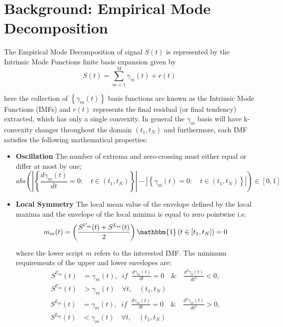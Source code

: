 \section{Background: Empirical Mode Decomposition}\label{sec:EMD_background}


\begin{Definition}
The Empirical Mode Decomposition of signal $S(t)$ is represented by the Intrinsic Mode Functions finite basis expansion given by
\begin{equation}
\label{EMD-for}
S(t) = \sum_{m=1}^M \gamma_m \left(t\right) + r \left(t \right)
\end{equation}

here the collection of $\left\{\gamma_m(t)\right\}$ basis functions are known as the Intrinsic Mode Functions (IMFs) and $r \left(t \right)$ represents the final residual (or final tendency) extracted, which has only a single convexity. In general the $\gamma_m$ basis will have k-convexity changes throughout the domain $(t_1, t_N)$ and furthermore, each IMF satisfies the following mathematical properties:
\begin{itemize}
\item \textbf{Oscillation} The number of extrema and zero-crossing must either equal or differ at most by one;
\begin{equation}
abs \left( \left| \left\{ \frac{d \gamma_m (t)}{dt} = 0 : \quad t \in \left( t_1, t_N \right) \right\} \right| - \left| \left\{ \gamma_m (t) = 0 : \quad t \in \left( t_1, t_N \right) \right\} \right| \right)  \in  \left[ 0, 1 \right]
\end{equation}
\item \textbf{Local Symmetry} The local mean value of the envelope defined by the local maxima and the envelope of the local minima is equal to zero pointwise i.e.   
\begin{equation}
\label{mean_env}
m_m(t) = \left(\frac{S^{U_m} (t) + S^{L_m} (t)}{2} \right) \mathbbm{1} \left( t \in [t_1, t_N] \right) = 0
\end{equation}

where the lower script $m$ refers to the interested IMF. The minimum requirements of the upper and lower envelopes are: 
\begin{equation}
\label{cond_1_sp}
\begin{split}
S^{U_m}(t) & =  \gamma_m(t), \; \; if \; \; \frac{d \gamma_m(t)}{dt} = 0 \quad \& \quad \frac{d^2 \gamma_k(t)}{d t^2} <0, \\
S^{U_m} (t) & > \gamma_m(t) \quad  \forall t, \quad (t_1, t_N)
\end{split}
\end{equation}
\begin{equation}
\label{cond_2_sp}
\begin{split}
S^{L_m} (t) & =  \gamma_m(t), \; \; if \; \; \frac{d \gamma_m(t)}{dt} = 0 \quad \& \quad \frac{d^2 \gamma_m(t)}{d t^2} > 0, \\
S^{L_m} (t) & < \gamma_m(t) \quad  \forall t, \quad (t_1, t_N)
\end{split}
\end{equation}
\end{itemize}
\end{Definition}